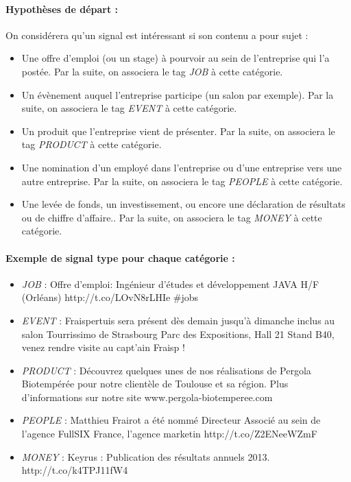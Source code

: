     \paragraph{Hypothèses de départ :}
        On considérera qu'un signal est intéressant si son contenu a pour sujet :
        \begin{itemize}
            \item Une offre d'emploi (ou un stage) à pourvoir au sein de l'entreprise qui l'a postée. Par la suite, on associera le tag \textit{JOB} à cette catégorie.
            \item Un évènement auquel l'entreprise participe (un salon par exemple). Par la suite, on associera le tag \textit{EVENT} à cette catégorie.
            \item Un produit que l'entreprise vient de présenter. Par la suite, on associera le tag \textit{PRODUCT} à cette catégorie.
            \item Une nomination d'un employé dans l'entreprise ou d'une entreprise vers une autre entreprise. Par la suite, on associera le tag \textit{PEOPLE} à cette catégorie.
            \item Une levée de fonds, un investissement, ou encore une déclaration de résultats ou de chiffre d'affaire.. Par la suite, on associera le tag \textit{MONEY} à cette catégorie.
        \end{itemize}

    \paragraph{Exemple de signal type pour chaque catégorie :}
        \begin{itemize}
            \item \textit{JOB} : \og Offre d'emploi: Ingénieur d'études et développement JAVA H/F (Orléans) http://t.co/LOvN8rLHIe \#jobs \fg
            \item \textit{EVENT} : \og  Fraispertuis sera présent dès demain jusqu'à dimanche inclus au salon \og Tourrissimo \fg de Strasbourg Parc des Expositions, Hall 21 Stand B40, venez rendre visite au capt'ain Fraisp ! \fg
            \item \textit{PRODUCT} : \og Découvrez quelques unes de nos réalisations de Pergola Biotempérée pour notre clientèle de Toulouse et sa région. Plus d'informations sur notre site www.pergola-biotemperee.com \fg
            \item \textit{PEOPLE} : \og Matthieu Frairot a été nommé Directeur Associé au sein de l'agence FullSIX France, l'agence marketin http://t.co/Z2ENeeWZmF \fg
            \item \textit{MONEY} : \og Keyrus : Publication des résultats annuels 2013. http://t.co/k4TPJ11fW4 \fg
        \end{itemize}

